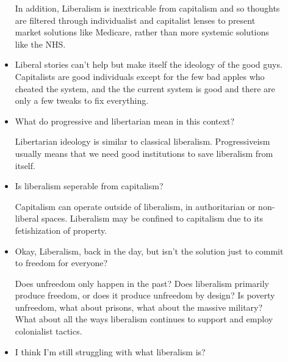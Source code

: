 \documentclass{report}
\begin{document}
\begin{description}
\begin{itemize}
                In addition, Liberalism is inextricable from capitalism and so thoughts
                are filtered through individualist and capitalist lenses to present
                market solutions like Medicare, rather than more systemic solutions
                like the NHS.

            \item Liberal stories can't help but make itself the ideology of the
                good guys. Capitalists are good individuals except for the few bad
                apples who cheated the system, and the the current system is
                good and there are only a few tweaks to fix everything.

            \item What do progressive and libertarian mean in this context?

                \vspace{10}

                Libertarian ideology is similar to classical liberalism. Progressiveism
                usually means that we need good institutions to save liberalism from
                itself.

            \item Is liberalism seperable from capitalism?

                \vspace{10}

                Capitalism can operate outside of liberalism, in authoritarian or
                non-liberal spaces. Liberalism may be confined to capitalism
                due to its fetishization of property.

            \item Okay, Liberalism, back in the day, but isn't the solution just to
                commit to freedom for everyone?

                \vspace{10}

                Does unfreedom only happen in the past? Does liberalism primarily
                produce freedom, or does it produce unfreedom by design? Is poverty
                unfreedom, what about prisons, what about the massive military? What
                about all the ways liberalism continues to support and employ colonialist
                tactics.

            \item I think I'm still struggling with what liberalism is?


\end{itemize}
\end{description}
\end{document}
